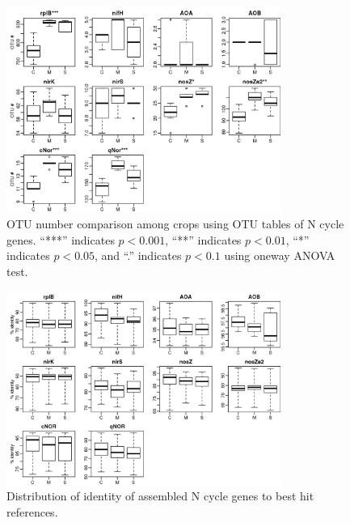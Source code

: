 \documentclass[12pt]{article}
\begin{document}
    \begin{figure}[tbph!]
    \centering
    \includegraphics[width=0.8\textwidth]{figures/xander-ncycle-otu-count}
    \caption[OTU number of N cycle genes]{OTU number comparison among crops using OTU tables of N cycle genes. ``***'' indicates $p <  0.001$, ``**'' indicates $p < 0.01$, ``*'' indicates $p < 0.05$, and ``.'' indicates $p < 0.1$ using oneway ANOVA test.}
    \label{fig:xander-ncycle-otu-count}
    \end{figure}


    \begin{figure}[tbph!]
    \centering
    \includegraphics[width=0.8\textwidth]{figures/xander-ncycle-similarity}
    \caption[Distribution of identity of assembled N cycle genes to references]{Distribution of identity of assembled N cycle genes to best hit references.}
    \label{fig:xander-ncycle-similarity}
    \end{figure}
\end{document}
